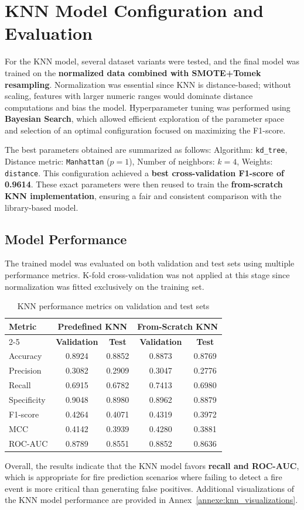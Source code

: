 \section{KNN Model Configuration and Evaluation}

For the KNN model, several dataset variants were tested, and the final model was trained on the \textbf{normalized data combined with SMOTE+Tomek resampling}. Normalization was essential since KNN is distance-based; without scaling, features with larger numeric ranges would dominate distance computations and bias the model. Hyperparameter tuning was performed using \textbf{Bayesian Search}, which allowed efficient exploration of the parameter space and selection of an optimal configuration focused on maximizing the F1-score.

The best parameters obtained are summarized as follows: Algorithm: \texttt{kd\_tree}, Distance metric: \texttt{Manhattan} (\(p = 1\)), Number of neighbors: \(k = 4\), Weights: \texttt{distance}.
This configuration achieved a \textbf{best cross-validation F1-score of 0.9614}. These exact parameters were then reused to train the \textbf{from-scratch KNN implementation}, ensuring a fair and consistent comparison with the library-based model.
\subsection{Model Performance}

The trained model was evaluated on both validation and test sets using multiple performance metrics. K-fold cross-validation was not applied at this stage since normalization was fitted exclusively on the training set.

\begin{table}[H]
\centering
\caption{KNN performance metrics on validation and test sets}
\begin{tabular}{lcccc}
\hline
\textbf{Metric} & \multicolumn{2}{c}{\textbf{Predefined KNN}} & \multicolumn{2}{c}{\textbf{From-Scratch KNN}} \\
\cline{2-5}
& \textbf{Validation} & \textbf{Test} & \textbf{Validation} & \textbf{Test} \\
\hline
Accuracy    & 0.8924 & 0.8852 & 0.8873 & 0.8769 \\
Precision   & 0.3082 & 0.2909 & 0.3047 & 0.2776 \\
Recall      & 0.6915 & 0.6782 & 0.7413 & 0.6980 \\
Specificity & 0.9048 & 0.8980 & 0.8962 & 0.8879 \\
F1-score    & 0.4264 & 0.4071 & 0.4319 & 0.3972 \\
MCC         & 0.4142 & 0.3939 & 0.4280 & 0.3881 \\
ROC-AUC     & 0.8789 & 0.8551 & 0.8852 & 0.8636 \\
\hline
\end{tabular}
\end{table}

Overall, the results indicate that the KNN model favors \textbf{recall and ROC-AUC}, which is appropriate for fire prediction scenarios where failing to detect a fire event is more critical than generating false positives.
Additional visualizations of the KNN model performance are provided in Annex~\ref{annexe:knn_visualizations}.